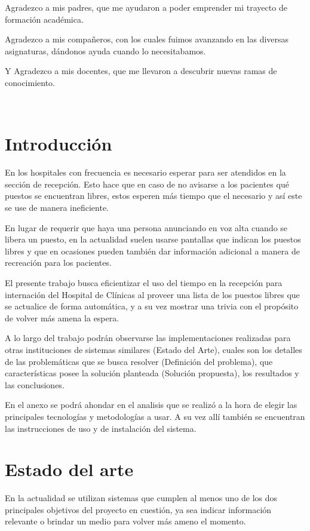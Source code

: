 \documentclass[twoside]{article}
\begin{document}
Agradezco a mis padres, que me ayudaron a poder emprender mi trayecto de formación académica.

Agradezco a mis compañeros, con los cuales fuimos avanzando en las diversas asignaturas, dándonos ayuda cuando lo necesitabamos.

Y Agradezco a mis docentes, que me llevaron a descubrir nuevas ramas de conocimiento.
\newpage
\
\newpage
\tableofcontents
\newpage
\
\newpage
\listoffigures
\newpage
\
\newpage
\section{Introducción}
En los hospitales con frecuencia es necesario esperar para ser atendidos en la sección de recepción. Esto hace que en caso de no avisarse a los pacientes qué puestos se encuentran libres, estos esperen más tiempo que el necesario y así este se use de manera ineficiente.

En lugar de requerir que haya una persona anunciando en voz alta cuando se libera un puesto, en la actualidad suelen usarse pantallas que indican los puestos libres y que en ocasiones pueden también dar información adicional a manera de recreación para los pacientes.

El presente trabajo busca eficientizar el uso del tiempo en la recepción para internación del Hospital de Clínicas al proveer una lista de los puestos libres que se actualice de forma automática, y a su vez mostrar una trivia con el propósito de volver más amena la espera.

A lo largo del trabajo podrán observarse las implementaciones realizadas para otras instituciones de sistemas similares (Estado del Arte), cuales son los detalles de las problemáticas que se busca resolver (Definición del problema), que características posee la solución planteada (Solución propuesta), los resultados y las conclusiones.

En el anexo se podrá ahondar en el analisis que se realizó a la hora de elegir las principales tecnologías y metodologías a usar. A su vez allí también se encuentran las instrucciones de uso y de instalación del sistema.
\section{Estado del arte}
En la actualidad se utilizan sistemas que cumplen al menos uno de los dos principales objetivos del proyecto en cuestión, ya sea indicar información relevante o brindar un medio para volver más ameno el momento.
\end{document}
